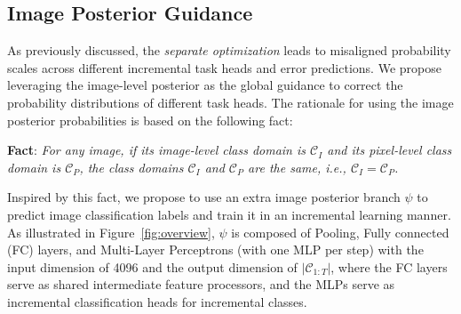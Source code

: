 \subsection{Image Posterior Guidance}
\label{sec3-3}

As previously discussed, the \textit{separate optimization} leads to misaligned probability scales across different incremental task heads and error predictions. 
We propose leveraging the image-level posterior as the global guidance to correct the probability distributions of different task heads. The rationale for using the image posterior probabilities is based on the following fact:

\textbf{Fact}: \textit{For any image, if its image-level class domain is \(\mathcal{C}_I\) and its pixel-level class domain is \(\mathcal{C}_P\), the class domains \(\mathcal{C}_I\) and \(\mathcal{C}_P\) are the same, i.e., \(\mathcal{C}_I = \mathcal{C}_P\).}

Inspired by this fact, we propose to use an extra image posterior branch $\psi$ to predict image classification labels and train it in an incremental learning manner. As illustrated in Figure~\ref{fig:overview}, $\psi$ is composed of Pooling, Fully connected (FC) layers, and Multi-Layer Perceptrons (with one MLP per step) with the input dimension of 4096 and the output dimension of \(\left|\mathcal{C}_{1:T}\right|\), where the FC layers serve as shared intermediate feature processors, and the MLPs serve as incremental classification heads for incremental classes. 




